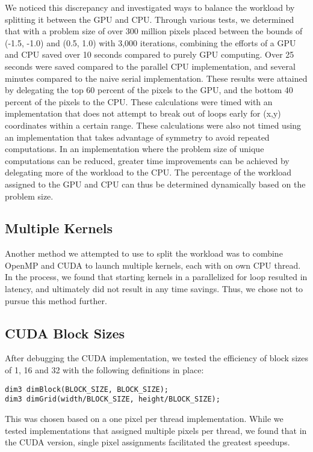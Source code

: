 \documentclass{article}
\begin{document}
We noticed this discrepancy and investigated ways to balance the workload
by splitting it between the GPU and CPU.
Through various tests, we determined that with a problem size of over 300
million pixels placed between the bounds of (-1.5, -1.0) and (0.5, 1.0) 
with 3,000 iterations, combining the efforts of a GPU and CPU saved over 10
seconds compared to purely GPU computing.
Over 25 seconds were saved compared to the parallel CPU implementation, and
several minutes compared to the naive serial implementation.
These results were attained by delegating the top 60 percent of the pixels
to the GPU, and the bottom 40 percent of the pixels to the CPU.
These calculations were timed with an implementation that does not attempt
to break out of loops early for (x,y) coordinates within a certain range.
These calculations were also not timed using an implementation that takes 
advantage of symmetry to avoid repeated computations.
In an implementation where the problem size of unique computations can be
reduced, greater time improvements can be achieved by delegating more of 
the workload to the CPU.
The percentage of the workload assigned to the GPU and CPU can thus be 
determined dynamically based on the problem size.

\subsection{Multiple Kernels}

Another method we attempted to use to split the workload was to combine
OpenMP and CUDA to launch multiple kernels, each with on own CPU thread.
In the process, we found that starting kernels in a parallelized for loop 
resulted in latency, and ultimately did not result in any time savings.
Thus, we chose not to pursue this method further.

\subsection{CUDA Block Sizes}

After debugging the CUDA implementation, we tested the efficiency of block 
sizes of 1, 16 and 32 with the following definitions in place: 

\begin{verbatim}
dim3 dimBlock(BLOCK_SIZE, BLOCK_SIZE); 
dim3 dimGrid(width/BLOCK_SIZE, height/BLOCK_SIZE);
\end{verbatim}

This was chosen based on a one pixel per thread implementation.
While we tested implementations that assigned multiple pixels per thread, 
we found that in the CUDA version, single pixel assignments facilitated the
greatest speedups.
\end{document}
